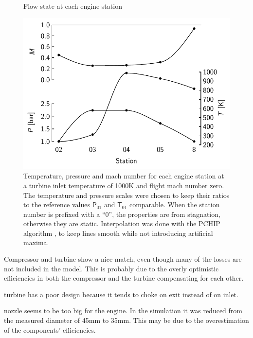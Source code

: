 \documentclass[tcc]{subfiles}
\begin{document}
\begin{figure}
    \caption{Flow state at each engine station}
    \includegraphics{fig/stations1000K}
    \caption*{Temperature, pressure and mach number for each engine station at a turbine inlet temperature of 1000K and flight mach number zero. The temperature and pressure scales were chosen to keep their ratios to the reference values $\mathsf P_{01}$ and $\mathsf T_{01}$ comparable. When the station number is prefixed with a ``0'', the properties are from stagnation, otherwise they are static. Interpolation was done with the PCHIP algorithm \cite{Fritsch1980}, to keep lines smooth while not introducing artificial maxima.}
\end{figure}

Compressor and turbine show a nice match, even though many of the losses are not included in the model.
This is probably due to the overly optimistic efficiencies in both the compressor and the turbine compensating for each other.

turbine has a poor design because it tends to choke on exit instead of on inlet.

nozzle seems to be too big for the engine. In the simulation it was reduced from the measured diameter of 45mm to 35mm. This may be due to the overestimation of the components' efficiencies.

\end{document}
